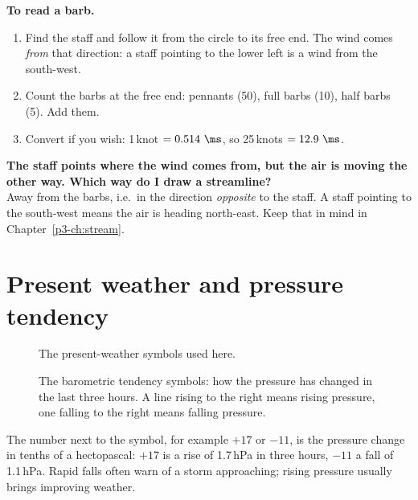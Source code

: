 \textbf{To read a barb.}
\begin{enumerate}[label=\textbf{Step \arabic*.},leftmargin=*,itemsep=3pt]
\item Find the staff and follow it from the circle to its free end. The wind comes \emph{from} that direction: a staff pointing to the lower left is a wind from the south-west.
\item Count the barbs at the free end: pennants (50), full barbs (10), half barbs (5). Add them.
\item Convert if you wish: 1\,knot $=0.514\ \ms$, so 25\,knots $=12.9\ \ms$.
\end{enumerate}

\begin{askbox}
\textbf{The staff points where the wind comes from, but the air is moving the other way. Which way do I draw a streamline?}\\
Away from the barbs, i.e.\ in the direction \emph{opposite} to the staff. A staff pointing to the south-west means the air is heading north-east. Keep that in mind in Chapter~\ref{p3-ch:stream}.
\end{askbox}

\section{Present weather and pressure tendency}

\begin{figure}[ht]
\centering
\begin{tikzpicture}[x=0.058cm,y=-0.058cm,line cap=round]\end{tikzpicture}
\caption{The present-weather symbols used here.}
\end{figure}

\begin{figure}[ht]
\centering
\begin{tikzpicture}[x=0.052cm,y=-0.052cm,line cap=round]\end{tikzpicture}
\caption{The barometric tendency symbols: how the pressure has changed in the last three hours. A line rising to the right means rising pressure, one falling to the right means falling pressure.}
\end{figure}

The number next to the symbol, for example $+17$ or $-11$, is the pressure change in tenths of a hectopascal: $+17$ is a rise of 1.7\,hPa in three hours, $-11$ a fall of 1.1\,hPa. Rapid falls often warn of a storm approaching; rising pressure usually brings improving weather.

